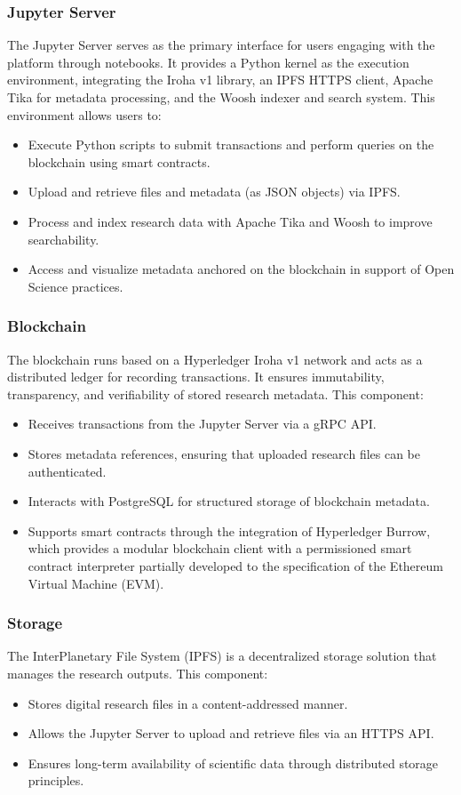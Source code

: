 \documentclass[final]{rc-book-2.14}
\begin{document}
\subsubsection{Jupyter Server}
The Jupyter Server serves as the primary interface for users engaging with the platform through notebooks. It provides a Python kernel as the execution environment, integrating the Iroha v1 library, an IPFS HTTPS client, Apache Tika for metadata processing, and the Woosh indexer and search system. This environment allows users to:

\begin{itemize}
    \item Execute Python scripts to submit transactions and perform queries on the blockchain using smart contracts.
    \item Upload and retrieve files and metadata (as JSON objects) via IPFS.
    \item Process and index research data with Apache Tika and Woosh to improve searchability.
    \item Access and visualize metadata anchored on the blockchain in support of Open Science practices.
\end{itemize}


\subsubsection{Blockchain}
The blockchain runs based on a Hyperledger Iroha v1 network and acts as a distributed ledger for recording transactions. It ensures immutability, transparency, and verifiability of stored research metadata. This component:
\begin{itemize}
    \item Receives transactions from the Jupyter Server via a gRPC API.
    \item Stores metadata references, ensuring that uploaded research files can be authenticated.
    \item Interacts with PostgreSQL for structured storage of blockchain metadata.
    \item Supports smart contracts through the integration of Hyperledger Burrow, which provides a modular blockchain client with a permissioned smart contract interpreter partially developed to the specification of the Ethereum Virtual Machine (EVM).

\end{itemize}

\subsubsection{Storage}
The InterPlanetary File System (IPFS) is a decentralized storage solution that manages the research outputs. This component:
\begin{itemize}
    \item Stores digital research files in a content-addressed manner.
    \item Allows the Jupyter Server to upload and retrieve files via an HTTPS API.
    \item Ensures long-term availability of scientific data through distributed storage principles.
\end{itemize}
\end{document}
